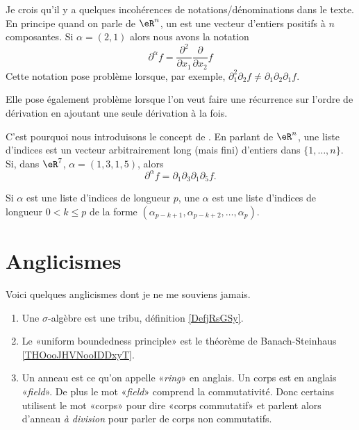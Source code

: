 \begin{normaltext}      \label{NORMooRRZCooMOKAzY}
	Je crois qu'il y a quelques incohérences de notations/dénominations dans le texte. En principe quand on parle de \( \eR^n\), un  \cite{BIBooYDMJooGDtdbo} est une vecteur d'entiers positifs à \( n\) composantes. Si \( \alpha=(2,1)\) alors nous avons la notation
	\begin{equation}
		\partial^{\alpha}f=\frac{ \partial^2  }{ \partial x_1 }\frac{ \partial  }{ \partial x_2 }f
	\end{equation}
	Cette notation pose problème lorsque, par exemple, \( \partial_1^2\partial_2f\neq \partial_1\partial_2\partial_1f\).

	Elle pose également problème lorsque l'on veut faire une récurrence sur l'ordre de dérivation en ajoutant une seule dérivation à la fois.

	C'est pourquoi nous introduisons le concept de . En parlant de \( \eR^n\), une liste d'indices est un vecteur arbitrairement long (mais fini) d'entiers dans \( \{ 1,\ldots, n \}\). Si, dans \( \eR^7\), \( \alpha=(1,3,1,5)\), alors
	\begin{equation}
		\partial^{\alpha}f=\partial_1\partial_3\partial_1\partial_5f.
	\end{equation}

	Si \( \alpha\) est une liste d'indices de longueur \( p\), une  \( \alpha\) est une liste d'indices de longueur \( 0 < k \leq p\) de la forme \( (\alpha_{p-k+1}, \alpha_{p-k+2},\ldots, \alpha_p)\).
\end{normaltext}


\section{Anglicismes}
\label{SECooPBZVooCVInFT}

Voici quelques anglicismes dont je ne me souviens jamais.
\begin{enumerate}
	\item
	      Une \( \sigma\)-algèbre est une tribu, définition \ref{DefjRsGSy}.
	\item
	      Le «uniform boundedness principle» est le théorème de Banach-Steinhaus \ref{THOooJHVNooIDDxyT}.
	\item
	      Un anneau est ce qu'on appelle «\emph{ring}» en anglais. Un corps est en anglais «\emph{field}». De plus le mot «\emph{field}» comprend la commutativité. Donc certains utilisent le mot «corps» pour dire «corps commutatif» et parlent alors d'anneau \emph{à division} pour parler de corps non commutatifs.
\end{enumerate}

